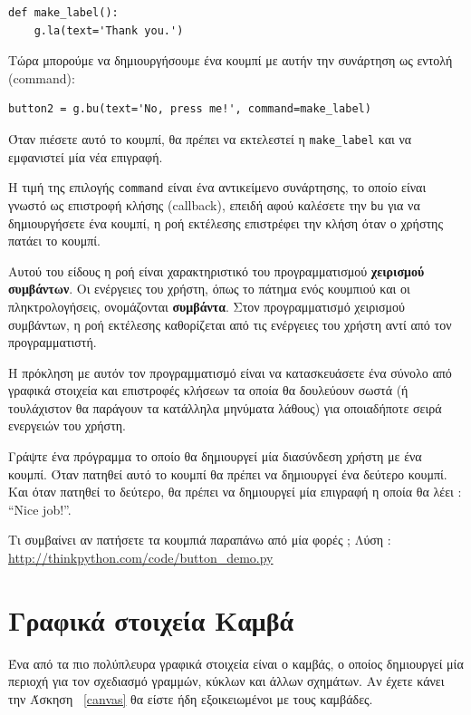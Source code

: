 \documentclass[10pt]{book}
\begin{document}
\begin{verbatim}
def make_label():
    g.la(text='Thank you.')
\end{verbatim}
%
 Τώρα μπορούμε να δημιουργήσουμε ένα κουμπί με αυτήν την συνάρτηση ως εντολή  
(command):

\begin{verbatim}
button2 = g.bu(text='No, press me!', command=make_label)
\end{verbatim}
%
 Όταν πιέσετε αυτό το κουμπί, θα πρέπει να εκτελεστεί η  \verb"make_label"  
και να εμφανιστεί μία νέα επιγραφή.

Η τιμή της επιλογής  {\tt command}  είναι ένα αντικείμενο συνάρτησης, το οποίο 
είναι γνωστό ως επιστροφή κλήσης  (callback),  επειδή αφού καλέσετε την  {\tt bu}  για να δημιουργήσετε ένα κουμπί, η ροή εκτέλεσης επιστρέφει την κλήση όταν ο χρήστης 
πατάει το κουμπί.

Αυτού του είδους η ροή είναι χαρακτηριστικό του προγραμματισμού {\bf χειρισμού συμβάντων}.  
Οι ενέργειες του χρήστη, όπως το πάτημα ενός κουμπιού και οι πληκτρολογήσεις, ονομάζονται 
{\bf συμβάντα}.  Στον προγραμματισμό χειρισμού συμβάντων, η ροή εκτέλεσης καθορίζεται από 
τις ενέργειες του χρήστη αντί από τον προγραμματιστή.

Η πρόκληση με αυτόν τον προγραμματισμό είναι να κατασκευάσετε ένα σύνολο από γραφικά 
στοιχεία και επιστροφές κλήσεων τα οποία θα δουλεύουν σωστά (ή τουλάχιστον θα παράγουν 
τα κατάλληλα μηνύματα λάθους) για οποιαδήποτε σειρά ενεργειών του χρήστη.


\begin{exercise}

Γράψτε ένα πρόγραμμα το οποίο θα δημιουργεί μία διασύνδεση χρήστη με ένα κουμπί.  
Όταν πατηθεί αυτό το κουμπί θα πρέπει να δημιουργεί ένα δεύτερο κουμπί.  Και όταν 
πατηθεί το δεύτερο, θα πρέπει να δημιουργεί μία επιγραφή η οποία θα λέει : ``Nice job!''.

 Τι συμβαίνει αν πατήσετε τα κουμπιά παραπάνω από μία φορές ; 
Λύση : \url{http://thinkpython.com/code/button_demo.py}
\end{exercise}


 
\section{Γραφικά στοιχεία Καμβά}

Ένα από τα πιο πολύπλευρα γραφικά στοιχεία είναι ο καμβάς, ο οποίος δημιουργεί 
μία περιοχή για τον σχεδιασμό γραμμών, κύκλων και άλλων σχημάτων.  Αν έχετε κάνει την 
Άσκηση~ \ref{canvas}  θα είστε ήδη εξοικειωμένοι με τους καμβάδες.
\end{document}
